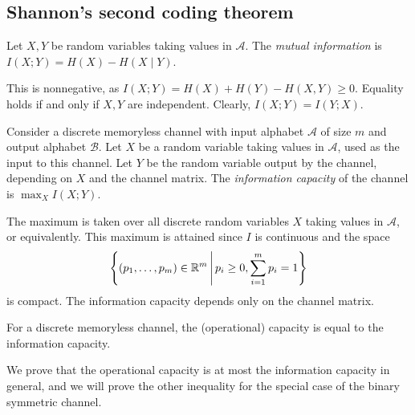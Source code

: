 \subsection{Shannon's second coding theorem}
\begin{definition}
    Let \( X, Y \) be random variables taking values in \( \mathcal A \).
    The \emph{mutual information} is \( I(X;Y) = H(X) - H(X \mid Y) \).
\end{definition}
This is nonnegative, as \( I(X;Y) = H(X) + H(Y) - H(X,Y) \geq 0 \).
Equality holds if and only if \( X, Y \) are independent.
Clearly, \( I(X;Y) = I(Y;X) \).
\begin{definition}
    Consider a discrete memoryless channel with input alphabet \( \mathcal A \) of size \( m \) and output alphabet \( \mathcal B \).
    Let \( X \) be a random variable taking values in \( \mathcal A \), used as the input to this channel.
    Let \( Y \) be the random variable output by the channel, depending on \( X \) and the channel matrix.
    The \emph{information capacity} of the channel is \( \max_{X} I(X;Y) \).
\end{definition}
The maximum is taken over all discrete random variables \( X \) taking values in \( \mathcal A \), or equivalently.
This maximum is attained since \( I \) is continuous and the space
\[ \qty{(p_1, \dots, p_m) \in \mathbb R^m \,\middle|\,p_i \geq 0, \sum_{i=1}^m p_i = 1} \]
is compact.
The information capacity depends only on the channel matrix.
\begin{theorem}
    For a discrete memoryless channel, the (operational) capacity is equal to the information capacity.
\end{theorem}
We prove that the operational capacity is at most the information capacity in general, and we will prove the other inequality for the special case of the binary symmetric channel.
